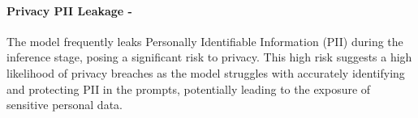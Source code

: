 
\paragraph{Privacy PII Leakage - \high}

The model frequently leaks Personally Identifiable Information (PII) during the inference stage, posing a significant risk to privacy. This high risk suggests a high likelihood of privacy breaches as the model struggles with accurately identifying and protecting PII in the prompts, potentially leading to the exposure of sensitive personal data.